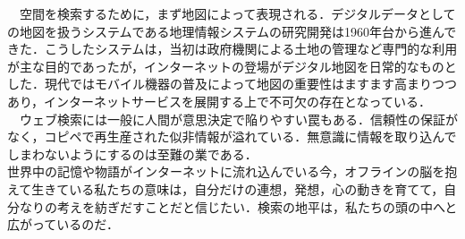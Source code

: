 \documentclass[uplatex,twocolumn,dvipdfmx]{jsarticle}
\begin{document}
　空間を検索するために，まず地図によって表現される．デジタルデータとしての地図を扱うシステムである地理情報システムの研究開発は1960年台から進んできた．こうしたシステムは，当初は政府機関による土地の管理など専門的な利用が主な目的であったが，インターネットの登場がデジタル地図を日常的なものとした．現代ではモバイル機器の普及によって地図の重要性はますます高まりつつあり，インターネットサービスを展開する上で不可欠の存在となっている．\\
　ウェブ検索には一般に人間が意思決定で陥りやすい罠もある．信頼性の保証がなく，コピペで再生産された似非情報が溢れている．無意識に情報を取り込んでしまわないようにするのは至難の業である．\\
世界中の記憶や物語がインターネットに流れ込んでいる今，オフラインの脳を抱えて生きている私たちの意味は，自分だけの連想，発想，心の動きを育てて，自分なりの考えを紡ぎだすことだと信じたい．検索の地平は，私たちの頭の中へと広がっているのだ．\cite{takano2015}



\end{document}
